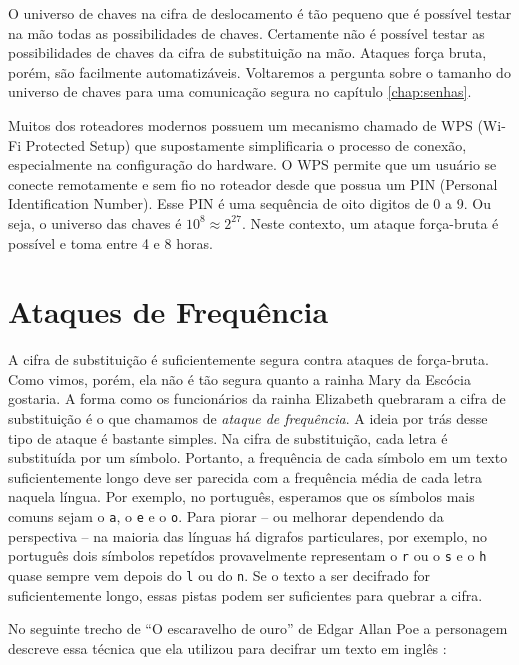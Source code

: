 O universo de chaves na cifra de deslocamento é tão pequeno que é possível testar na mão todas as possibilidades de chaves.
Certamente não é possível testar as possibilidades de chaves da cifra de substituição na mão.
Ataques força bruta, porém, são facilmente automatizáveis.
Voltaremos a pergunta sobre o tamanho do universo de chaves para uma comunicação segura no capítulo \ref{chap:senhas}.


\begin{example}
Muitos dos roteadores modernos possuem um mecanismo chamado de WPS (Wi-Fi Protected Setup) que supostamente simplificaria o processo de conexão, especialmente na configuração do hardware.
O WPS permite que um usuário se conecte remotamente e sem fio no roteador desde que possua um PIN (Personal Identification Number).
Esse PIN é uma sequência de oito digitos de 0 a 9.
Ou seja, o universo das chaves é $10^8 \approx 2^{27}$.
Neste contexto, um ataque força-bruta é possível e toma entre 4 e 8 horas.  
\end{example}


\section{Ataques de Frequência}
\label{sec:frequencia}

A cifra de substituição é suficientemente segura contra ataques de força-bruta.
Como vimos, porém, ela não é tão segura quanto a rainha Mary da Escócia gostaria.
A forma como os funcionários da rainha Elizabeth quebraram a cifra de substituição é o que chamamos de {\em ataque de frequência}.
A ideia por trás desse tipo de ataque é bastante simples.
Na cifra de substituição, cada letra é substituída por um símbolo.
Portanto, a frequência de cada símbolo em um texto suficientemente longo deve ser parecida com a frequência média de cada letra naquela língua.
Por exemplo, no português, esperamos que os símbolos mais comuns sejam o {\tt a}, o {\tt e} e o {\tt o}.
Para piorar -- ou melhorar dependendo da perspectiva -- na maioria das línguas há digrafos particulares, por exemplo, no português dois símbolos repetídos provavelmente representam o {\tt r} ou o {\tt s} e o {\tt h} quase sempre vem depois do {\tt l} ou do {\tt n}.
Se o texto a ser decifrado for suficientemente longo, essas pistas podem ser suficientes para quebrar a cifra.

No seguinte trecho de ``O escaravelho de ouro'' de Edgar Allan Poe a personagem descreve essa técnica que ela utilizou para decifrar um texto em inglês \cite{}:

